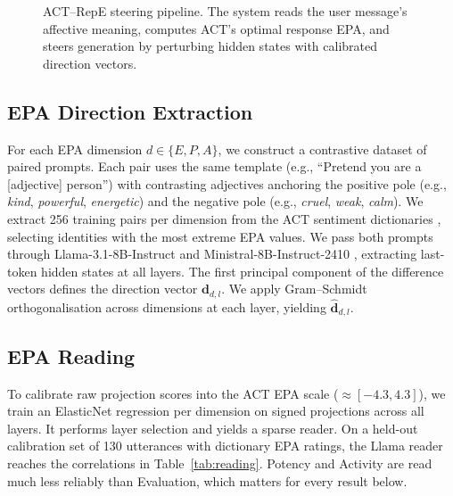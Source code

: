 \documentclass[letterpaper]{article} %
\begin{document}
\begin{figure}[t]
\centering
{}
\caption{ACT--RepE steering pipeline. The system reads the user message's affective meaning, computes ACT's optimal response EPA, and steers generation by perturbing hidden states with calibrated direction vectors.}
\label{fig:pipeline}
\end{figure}

\subsection{EPA Direction Extraction}

For each EPA dimension $d \in \{E, P, A\}$, we construct a contrastive dataset of paired prompts. Each pair uses the same template (e.g., ``Pretend you are a [adjective] person'') with contrasting adjectives anchoring the positive pole (e.g., \textit{kind}, \textit{powerful}, \textit{energetic}) and the negative pole (e.g., \textit{cruel}, \textit{weak}, \textit{calm}). We extract 256 training pairs per dimension from the ACT sentiment dictionaries \citep{heise2007expressive}, selecting identities with the most extreme EPA values. We pass both prompts through Llama-3.1-8B-Instruct \citep{grattafiori2024llama3} and Ministral-8B-Instruct-2410 \citep{mistral2024ministral}, extracting last-token hidden states at all layers. The first principal component of the difference vectors defines the direction vector $\mathbf{d}_{d,l}$. We apply Gram--Schmidt orthogonalisation across dimensions at each layer, yielding $\hat{\mathbf{d}}_{d,l}$.

\subsection{EPA Reading}

To calibrate raw projection scores into the ACT EPA scale ($\approx [-4.3, 4.3]$), we train an ElasticNet regression \citep{zou2005regularization} per dimension on signed projections across all layers. It performs layer selection and yields a sparse reader. On a held-out calibration set of 130 utterances with dictionary EPA ratings, the Llama reader reaches the correlations in Table~\ref{tab:reading}. Potency and Activity are read much less reliably than Evaluation, which matters for every result below.
\end{document}

